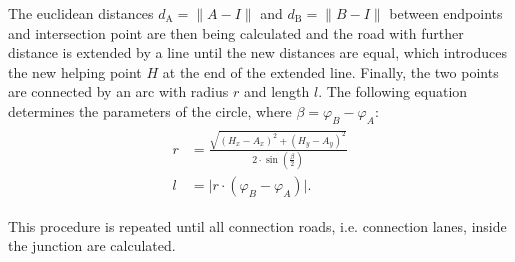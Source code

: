 \documentclass[a4paper, 10pt, conference]{ieeeconf}      %
\begin{document}
    The euclidean distances $d_\text{A} = \|A-I\|$ and $d_\text{B} = \|B-I\|$ between endpoints and intersection point are then being calculated and the road with further distance is extended by a line until the new distances are equal, which introduces the new helping point \(H\) at the end of the extended line. Finally, the two points are connected by an arc with radius \(r\) and length \(l\). The following equation determines the parameters of the circle, where \(\beta = \varphi_B - \varphi_A\):
    \begin{align}
        \begin{split}           
        r &= \frac{\sqrt{\left(H_x - A_x\right)^2 + \left(H_y - A_y\right)^2}}{2 \cdot \sin\left(\frac{\beta}{2}\right)} \\
        l &= \vert r \cdot \left(\varphi_B - \varphi_A\right) \vert \text{.}  
        \end{split}
    \end{align}
    
    This procedure is repeated until all connection roads, i.e. connection lanes, inside the junction are calculated.
\end{document}
